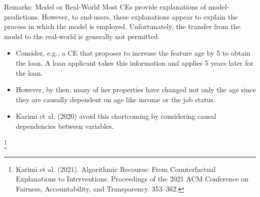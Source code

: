\documentclass[11pt,compress,t,notes=noshow, xcolor=table]{beamer}
\begin{document}
\begin{vbframe}{Remarks: Model or Real-World}
Most CEs provide explanations of model-predictions. However, to end-users, these explanations appear to explain the process in which the model is employed. Unfortunately, the transfer from the model to the real-world is generally not permitted.
	\begin{itemize}
	\item Consider, e.g., a CE that proposes to increase the feature age by 5 to obtain the loan. A loan applicant takes this information and applies 5 years later for the loan. 
	\item However, by then, many of her properties have changed not only the age since they are causally dependent on age like income or the job status.
	\item Karimi et al. (2020) avoid this shortcoming by considering causal dependencies between variables.
	\end{itemize}
\footnote[frame]{Karimi et al. (2021). Algorithmic Recourse: From Counterfactual Explanations to Interventions.  Proceedings of the 2021 ACM Conference on Fairness, Accountability, and Transparency. 353–362.}
\end{vbframe}


\endlecture
\end{document}

